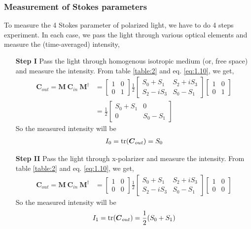 \documentclass[11pt,a4paper]{article}
\numberwithin{equation}{section}
\begin{document}
\subsubsection{Measurement of Stokes parameters}
 To measure the 4 Stokes parameter of polarized light, we have to do 4 steps experiment. In each case, we pass the light through various optical elements and measure the (time-averaged) intensity, \cite{stokes}
 \begin{enumerate}
 	\item[\textbf{Step I}] 
 	Pass the light through homogenous isotropic medium (or, free space) and measure the intensity. From table \ref{table:2} and eq. \ref{eq:1.10}, we get,
 	\begin{align}
 		\boldsymbol{C}_{out} = \boldsymbol{M}\:\boldsymbol{C}_{in}\:\boldsymbol{M}^\dagger
 		&=\begin{bmatrix} 1 & 0 \\ 0 & 1 \end{bmatrix} 
 		\frac{1}{2} \begin{bmatrix} S_0+S_1 & S_2+iS_3 \\ S_2-iS_3 & S_0-S_1\end{bmatrix}
 		\begin{bmatrix} 1 & 0 \\ 0 & 1 \end{bmatrix}\nonumber\\
 		&= \frac{1}{2} \begin{bmatrix} S_0+S_1 & 0 \\ 0 & S_0-S_1\end{bmatrix}
 	\end{align}
 	So the measured intensity will be 
 	\begin{align}
 		I_0 = \tr(\boldsymbol{C}_{out}) = S_0 \label{s I}
 	\end{align}
 
 \item[\textbf{Step II}] 
 Pass the light through x-polarizer and measure the intensity. From table \ref{table:2} and eq. \ref{eq:1.10}, we get,
 \begin{align}
 	\boldsymbol{C}_{out} = \boldsymbol{M}\:\boldsymbol{C}_{in}\:\boldsymbol{M}^\dagger
 	&=\begin{bmatrix} 1 & 0 \\ 0 & 0 \end{bmatrix} 
 	\frac{1}{2} \begin{bmatrix} S_0+S_1 & S_2+iS_3 \\ S_2-iS_3 & S_0-S_1\end{bmatrix}
 	\begin{bmatrix} 1 & 0 \\ 0 & 0 \end{bmatrix}
 \end{align}
 So the measured intensity will be 
 \begin{align}
 	I_1 = \tr(\boldsymbol{C}_{out}) = \frac{1}{2} (S_0+S_1) \label{s II}
 \end{align}


\end{enumerate}
\end{document}
